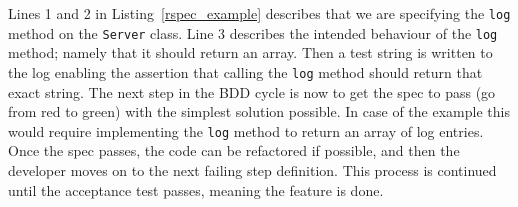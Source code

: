 Lines 1 and 2 in Listing~\ref{rspec_example} describes that we are specifying
the \texttt{log} method on the \texttt{Server} class. Line 3 describes the
intended behaviour of the \texttt{log} method; namely that it should return an
array. Then a test string is written to the log enabling the assertion that
calling the \texttt{log} method should return that exact string. The next step
in the BDD cycle is now to get the spec to pass (go from red to green) with
the simplest solution possible. In case of the example this would require
implementing the \texttt{log} method to return an array of log entries. Once
the spec passes, the code can be refactored if possible, and then the
developer moves on to the next failing step definition. This process is
continued until the acceptance test passes, meaning the feature is done.
